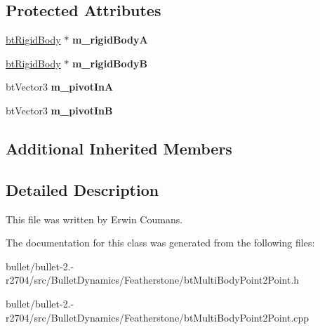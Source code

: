 \subsection*{Protected Attributes}
\begin{DoxyCompactItemize}
\item 
\hypertarget{classbt_multi_body_point2_point_a03f7a8290bbac87077a50d536fba5028}{\hyperlink{classbt_rigid_body}{bt\+Rigid\+Body} $\ast$ {\bfseries m\+\_\+rigid\+Body\+A}}\label{classbt_multi_body_point2_point_a03f7a8290bbac87077a50d536fba5028}

\item 
\hypertarget{classbt_multi_body_point2_point_a802d884cb8cbb90aa77bb476698ca2b7}{\hyperlink{classbt_rigid_body}{bt\+Rigid\+Body} $\ast$ {\bfseries m\+\_\+rigid\+Body\+B}}\label{classbt_multi_body_point2_point_a802d884cb8cbb90aa77bb476698ca2b7}

\item 
\hypertarget{classbt_multi_body_point2_point_ad3e1812e91479d2e73a3c0b34d2cc26a}{bt\+Vector3 {\bfseries m\+\_\+pivot\+In\+A}}\label{classbt_multi_body_point2_point_ad3e1812e91479d2e73a3c0b34d2cc26a}

\item 
\hypertarget{classbt_multi_body_point2_point_a9a50e6480f1cb00db53937594484226e}{bt\+Vector3 {\bfseries m\+\_\+pivot\+In\+B}}\label{classbt_multi_body_point2_point_a9a50e6480f1cb00db53937594484226e}

\end{DoxyCompactItemize}
\subsection*{Additional Inherited Members}


\subsection{Detailed Description}
This file was written by Erwin Coumans. 

The documentation for this class was generated from the following files\+:\begin{DoxyCompactItemize}
\item 
bullet/bullet-\/2.-\/r2704/src/\+Bullet\+Dynamics/\+Featherstone/bt\+Multi\+Body\+Point2\+Point.\+h\item 
bullet/bullet-\/2.-\/r2704/src/\+Bullet\+Dynamics/\+Featherstone/bt\+Multi\+Body\+Point2\+Point.\+cpp\end{DoxyCompactItemize}
